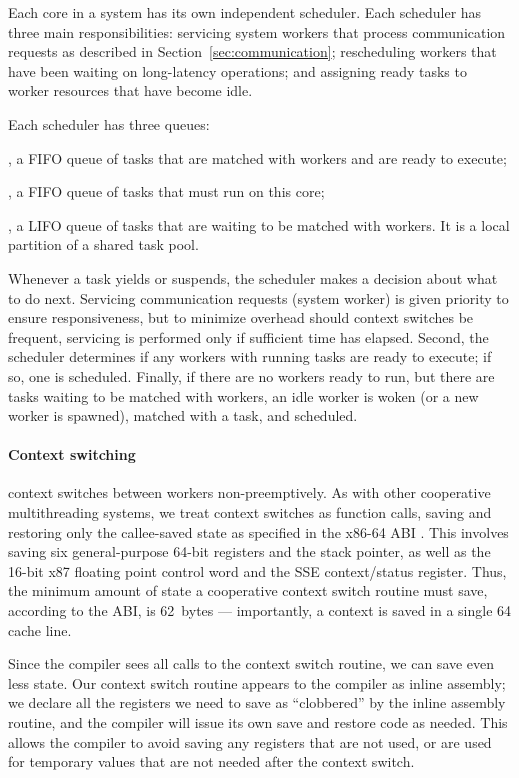 Each core in a \Grappa system has its own independent scheduler. Each
scheduler has three main responsibilities: servicing system workers that
process communication requests as described in
Section~\ref{sec:communication}; rescheduling workers that have been waiting
on long-latency operations; and assigning ready tasks to worker resources that
have become idle.

Each scheduler has three queues:

, a FIFO queue of tasks that are
  matched with workers and are ready to execute;

, a FIFO queue of tasks that must run on this core;

,  a LIFO queue of tasks that are
  waiting to be matched with workers. It is a local partition of a shared
  task pool.


Whenever a task yields or suspends, the scheduler makes a decision about what
to do next. Servicing communication requests (system worker) is given priority
to ensure responsiveness, but to minimize overhead should context switches be
frequent, servicing is performed only if sufficient time has elapsed. Second,
the scheduler determines if any workers with running tasks are ready to
execute; if so, one is scheduled. Finally, if there are no workers ready to
run, but there are tasks waiting to be matched with workers, an idle worker is
woken (or a new worker is spawned), matched with a task, and scheduled.

\paragraph{Context switching} \Grappa context switches between workers
non-preemptively. As with other cooperative multithreading systems, we
treat context switches as function calls, saving and restoring only the
callee-saved state as specified in the x86-64 ABI \cite{amd64:abi:2012}. This
involves saving six general-purpose 64-bit registers and the stack
pointer, as well as the 16-bit x87 floating point control word and the
SSE context/status register. Thus, the minimum amount of state a
cooperative context switch routine must save, according to the ABI, is
62~bytes --- importantly, a context is saved in a single 64 cache line. 

Since the compiler sees all calls to the context switch routine, we
can save even less state. Our context switch routine appears to the
compiler as inline assembly; we declare all the registers we need
to save as ``clobbered'' by the inline assembly routine, and the
compiler will issue its own save and restore code as needed. This allows the
compiler to avoid saving any registers that are not used, or are used
for temporary values that are not needed after the context switch.

